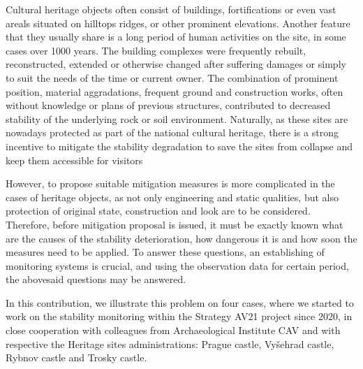 {Cultural heritage objects often consist of buildings, fortifications or even vast areals situated on hilltops ridges, or other prominent elevations. Another feature that they usually share is a long period of human activities on the site, in some cases over 1000 years. The building complexes were frequently rebuilt, reconstructed, extended or otherwise changed after suffering damages or simply to suit the needs of the time or current owner. The combination of prominent position, material aggradations, frequent ground and construction works, often without knowledge or plans of previous structures, contributed to decreased stability of the underlying rock or soil environment. Naturally, as these sites are nowadays protected as part of the national cultural heritage, there is a strong incentive to mitigate the stability degradation to save the sites from collapse and keep them accessible for visitors  

However, to propose suitable mitigation measures is more complicated in the cases of heritage objects, as not only engineering and static qualities, but also protection of original state, construction and look are to be considered. Therefore, before mitigation proposal is issued, it must be exactly known what are the causes of the stability deterioration, how dangerous it is and how soon the measures need to be applied. To answer these questions, an establishing of monitoring systems is crucial, and using the observation data for certain period, the abovesaid questions may be answered.   

In this contribution, we illustrate this problem on four cases, where we started to work on the stability monitoring within the Strategy AV21 project since 2020, in close cooperation with colleagues from Archaeological Institute CAV and with respective the Heritage sites administrations: Prague castle, Vyšehrad castle, Rybnov castle and Trosky castle. 
}
{
}

